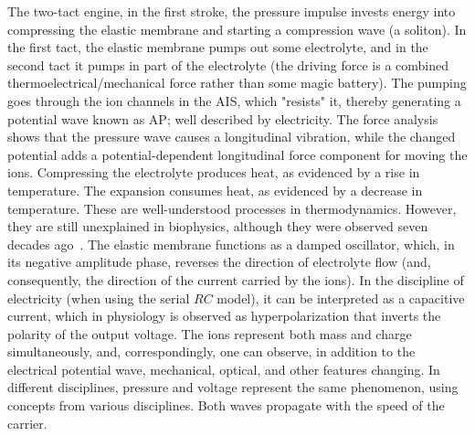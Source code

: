 \ifx\magyar\undefined
The two-tact engine, in the first stroke, the pressure impulse invests energy into compressing the elastic membrane and starting a compression wave (a soliton). In the first tact, the elastic membrane pumps out some electrolyte, and in the second tact it pumps in part of the electrolyte (the driving force is a combined thermoelectrical/mechanical force rather than some magic battery). The pumping goes through the ion channels in the \gls{AIS}, which "resists" it, thereby generating a potential wave known as \gls{AP}; well described by electricity. The force analysis shows that the pressure wave
causes a longitudinal vibration, while the changed potential adds
a potential-dependent longitudinal force component for moving the ions. Compressing the electrolyte
produces heat, as evidenced by a rise in temperature. The expansion consumes heat, as evidenced by a decrease in temperature. These are well-understood processes in thermodynamics.
However, they are still unexplained in biophysics, although they were observed
seven decades ago~\cite{HeatProductionNeuron:1958}.
The elastic membrane functions as a damped oscillator, which, in its negative amplitude phase, reverses the direction of electrolyte flow (and, consequently, the direction of the current carried by the ions).
In the discipline of electricity (when using the serial $RC$ model), it can be interpreted as a capacitive current, which in physiology is observed as hyperpolarization that inverts the polarity of the output voltage.
The ions represent both mass and charge simultaneously, and, correspondingly, one can observe, in addition to the electrical potential wave, mechanical, optical, and other features changing.
In different disciplines, pressure and voltage represent the same phenomenon, using concepts from various disciplines.
Both waves propagate with the speed of the carrier.

